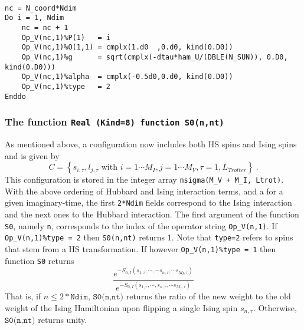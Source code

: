 \begin{lstlisting}

nc = N_coord*Ndim 
Do i = 1, Ndim
    nc = nc + 1
    Op_V(nc,1)%P(1)   = i 
    Op_V(nc,1)%O(1,1) = cmplx(1.d0  ,0.d0, kind(0.D0))
    Op_V(nc,1)%g      = sqrt(cmplx(-dtau*ham_U/(DBLE(N_SUN)), 0.D0, kind(0.D0)))
    Op_V(nc,1)%alpha  = cmplx(-0.5d0,0.d0, kind(0.D0))
    Op_V(nc,1)%type   = 2
Enddo

\end{lstlisting}

\subsubsection{The function \texttt{Real (Kind=8) function S0(n,nt)} }\label{sec:s0}

As mentioned above,  a configuration now includes both HS spins and Ising spins and is given by
\begin{equation}
	C = \left\{   s_{i,\tau} ,  l_{j,\tau}  \text{ with }  i=1\cdots M_I,  j = 1\cdots M_V,  \tau=1,L_{Trotter}  \right\}\:.
\end{equation}
This configuration is stored in the  integer array \texttt{nsigma(M\_V + M\_I, Ltrot)}.  With the above ordering of Hubbard and Ising interaction terms,  and a for a given  imaginary-time, the first \texttt{2*Ndim} fields correspond to the Ising interaction and the next  ones to the Hubbard interaction.
The first   argument of the function \texttt{S0}, namely \texttt{n},  corresponds to the index of the operator  string 
\texttt{Op\_V(n,1)}. If \texttt{Op\_V(n,1)\%type = 2} then   \texttt{S0(n,nt)}  returns 1. Note that \texttt{type=2} refers to spins that stem from a  HS transformation. 
If however  \texttt{Op\_V(n,1)\%type = 1}  then function \texttt{S0}  returns
\begin{equation}
\frac{e^{-S_{0,I} \left(  s_{1,\tau},  \cdots,  - s_{n,\tau},  \cdots s_{M_I,\tau}   \right) } }{e^{-S_{0,I}  \left(  s_{1,\tau},  \cdots,   s_{n,\tau},  \cdots s_{M_I,\tau}   \right)   } }	
\end{equation}
That is,   if $n \leq 2* \texttt{Ndim} $,    $ \texttt{S0(n,nt)} $  returns the ratio of the new weight to the old weight  of the  Ising Hamiltonian upon flipping a single Ising spin $ s_{n,\tau} $.  Otherwise, $ \texttt{S0(n,nt)} $   returns unity. 

